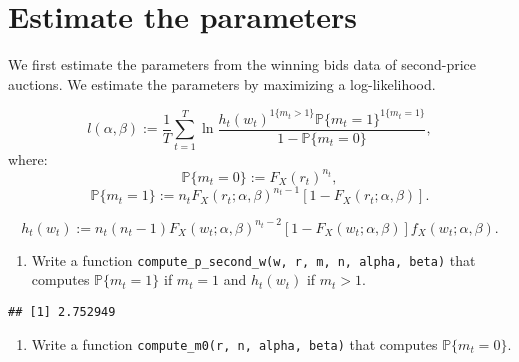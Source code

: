 \documentclass[
]{book}
\newenvironment{Shaded}{\begin{snugshade}}{\end{snugshade}}
\newcommand{\CommentTok}[1]{\textcolor[rgb]{0.56,0.35,0.01}{\textit{#1}}}
\newcommand{\DecValTok}[1]{\textcolor[rgb]{0.00,0.00,0.81}{#1}}
\newcommand{\KeywordTok}[1]{\textcolor[rgb]{0.13,0.29,0.53}{\textbf{#1}}}
\newcommand{\NormalTok}[1]{#1}
\newcommand{\OperatorTok}[1]{\textcolor[rgb]{0.81,0.36,0.00}{\textbf{#1}}}
\newcommand{\StringTok}[1]{\textcolor[rgb]{0.31,0.60,0.02}{#1}}
\providecommand{\tightlist}{%
  \setlength{\itemsep}{0pt}\setlength{\parskip}{0pt}}
\begin{document}
\hypertarget{estimate-the-parameters}{%
\section{Estimate the parameters}\label{estimate-the-parameters}}

We first estimate the parameters from the winning bids data of second-price auctions. We estimate the parameters by maximizing a log-likelihood.

\[
l(\alpha, \beta) := \frac{1}{T} \sum_{t = 1}^T \ln\frac{h_t(w_t)^{1\{m_t > 1\}} \mathbb{P}\{m_t = 1\}^{1\{m_t = 1\}} }{1 - \mathbb{P}\{m_t = 0\}},
\]
where:
\[
\mathbb{P}\{m_t = 0\} := F_X(r_t)^{n_t},
\]
\[
\mathbb{P}\{m_t = 1\} := n_t F_X(r_t; \alpha, \beta)^{n_t - 1} [1 - F_X(r_t; \alpha, \beta)].
\]

\[
h_t(w_t) := n_t (n_t - 1) F_X(w_t; \alpha, \beta)^{n_t - 2} [1 - F_X(w_t; \alpha, \beta)] f_X(w_t; \alpha, \beta).
\]

\begin{enumerate}
\def\labelenumi{\arabic{enumi}.}
\tightlist
\item
  Write a function \texttt{compute\_p\_second\_w(w,\ r,\ m,\ n,\ alpha,\ beta)} that computes \(\mathbb{P}\{m_t = 1\}\) if \(m_t = 1\) and \(h_t(w_t)\) if \(m_t > 1\).
\end{enumerate}

\begin{Shaded}
\end{Shaded}

\begin{verbatim}
## [1] 2.752949
\end{verbatim}

\begin{enumerate}
\def\labelenumi{\arabic{enumi}.}
\setcounter{enumi}{1}
\tightlist
\item
  Write a function \texttt{compute\_m0(r,\ n,\ alpha,\ beta)} that computes \(\mathbb{P}\{m_t = 0\}\).
\end{enumerate}
\end{document}
